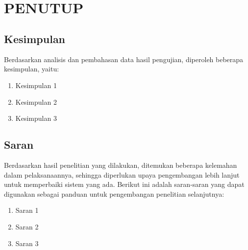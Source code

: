 \chapter[PENUTUP]{\\PENUTUP}

\section{Kesimpulan}
Berdasarkan analisis dan pembahasan data hasil pengujian, diperoleh beberapa kesimpulan, yaitu:
\begin{enumerate}
    \item Kesimpulan 1
    \item Kesimpulan 2
    \item Kesimpulan 3
\end{enumerate}

\section{Saran}
Berdasarkan hasil penelitian yang dilakukan, ditemukan beberapa kelemahan dalam pelaksanaannya, sehingga diperlukan upaya pengembangan lebih lanjut untuk memperbaiki sistem yang ada. Berikut ini adalah saran-saran yang dapat digunakan sebagai panduan untuk pengembangan penelitian selanjutnya:
\begin{enumerate}
    \item Saran 1
    \item Saran 2
    \item Saran 3
\end{enumerate}